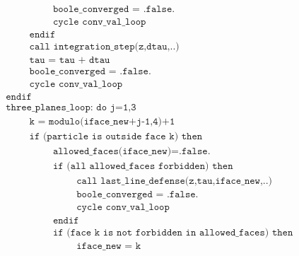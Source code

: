 \documentclass[./main.tex]{subfiles}
\begin{document}
\begin{align*}
&\hspace{3cm} \texttt{boole\_converged = .false.}\nonumber\\
&\hspace{3cm} \texttt{cycle conv\_val\_loop}\nonumber\\
&\hspace{2cm} \texttt{endif}\nonumber\\
&\hspace{2cm} \texttt{call integration\_step(z,dtau,..)}\nonumber\\
&\hspace{2cm} \texttt{tau = tau + dtau}\nonumber\\
&\hspace{2cm} \texttt{boole\_converged = .false.}\nonumber\\
&\hspace{2cm} \texttt{cycle conv\_val\_loop }\nonumber\\
&\hspace{1cm} \texttt{endif}\nonumber\\
&\hspace{1cm} \texttt{three\_planes\_loop: do j=1,3}\nonumber\\
&\hspace{2cm} \texttt{k = modulo(iface\_new+j-1,4)+1}\nonumber\\
&\hspace{2cm} \texttt{if (particle is outside face k) then}\nonumber\\
&\hspace{3cm} \texttt{allowed\_faces(iface\_new)=.false.}\nonumber\\
&\hspace{3cm} \texttt{if (all allowed\_faces forbidden) then}\nonumber\\
&\hspace{4cm} \texttt{call last\_line\_defense(z,tau,iface\_new,..)}\nonumber\\
&\hspace{4cm} \texttt{boole\_converged = .false.}\nonumber\\
&\hspace{4cm} \texttt{cycle conv\_val\_loop}\nonumber\\
&\hspace{3cm} \texttt{endif}\nonumber\\
&\hspace{3cm} \texttt{if (face k is not forbidden in allowed\_faces) then}\nonumber\\
&\hspace{4cm} \texttt{iface\_new = k}\nonumber\\

\end{align*}
\end{document}
